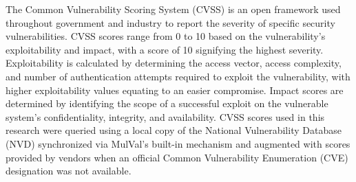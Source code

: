 



The Common Vulnerability Scoring System\cite{Mell07thecommon} (CVSS) is an open framework used throughout government and industry to report the severity of specific security vulnerabilities. CVSS scores range from 0 to 10 based on the vulnerability’s exploitability and impact, with a score of 10 signifying the highest severity.  Exploitability is calculated by determining the access vector, access complexity, and number of authentication attempts required to exploit the vulnerability, with higher exploitability values equating to an easier compromise. Impact scores are determined by identifying the scope of a successful exploit on the vulnerable system’s confidentiality, integrity, and availability. CVSS scores used in this research were queried using a local copy of the National Vulnerability Database (NVD) synchronized via MulVal's built-in mechanism and augmented with scores provided by vendors when an official Common Vulnerability Enumeration (CVE) designation was not available.  

